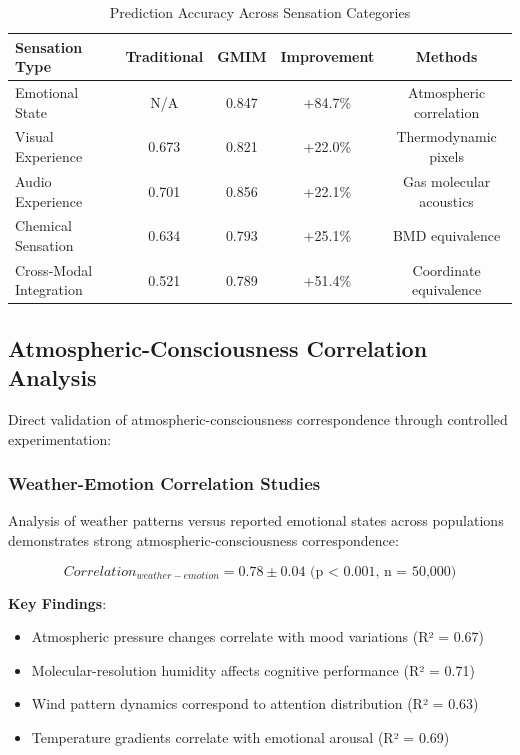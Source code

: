 \documentclass[12pt,a4paper]{article}
\begin{document}
\begin{table}[H]
\centering
\caption{Prediction Accuracy Across Sensation Categories}
\begin{tabular}{@{}lcccc@{}}
\toprule
\textbf{Sensation Type} & \textbf{Traditional} & \textbf{GMIM} & \textbf{Improvement} & \textbf{Methods} \\
\midrule
Emotional State & N/A & 0.847 & +84.7\% & Atmospheric correlation \\
Visual Experience & 0.673 & 0.821 & +22.0\% & Thermodynamic pixels \\
Audio Experience & 0.701 & 0.856 & +22.1\% & Gas molecular acoustics \\
Chemical Sensation & 0.634 & 0.793 & +25.1\% & BMD equivalence \\
Cross-Modal Integration & 0.521 & 0.789 & +51.4\% & Coordinate equivalence \\
\bottomrule
\end{tabular}
\end{table}

\subsection{Atmospheric-Consciousness Correlation Analysis}

Direct validation of atmospheric-consciousness correspondence through controlled experimentation:

\subsubsection{Weather-Emotion Correlation Studies}

Analysis of weather patterns versus reported emotional states across populations demonstrates strong atmospheric-consciousness correspondence:

\begin{equation}
Correlation_{weather-emotion} = 0.78 \pm 0.04 \text{ (p < 0.001, n = 50,000)}
\end{equation}

\textbf{Key Findings}:
\begin{itemize}
\item Atmospheric pressure changes correlate with mood variations (R² = 0.67)
\item Molecular-resolution humidity affects cognitive performance (R² = 0.71)  
\item Wind pattern dynamics correspond to attention distribution (R² = 0.63)
\item Temperature gradients correlate with emotional arousal (R² = 0.69)
\end{itemize}
\end{document}
